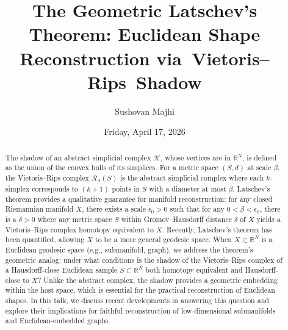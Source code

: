 \documentclass{UAmathtalk}
\author{Sushovan Majhi }
\title{The Geometric Latschev’s Theorem: Euclidean Shape Reconstruction via~Vietoris–Rips~Shadow}
\date{Friday, April 17, 2026}
\begin{document}
\maketitle
\renewcommand*{\abstractsize}{\fontsize{13.5}{16.2}\selectfont}
\begin{abstract}
{The shadow of an abstract simplicial complex $\mathcal{K}$, whose vertices are in $\mathbb{R}^N$, is defined as the union of the convex hulls of its simplices. For a metric space $(S, d)$ at scale $\beta$, the Vietoris–Rips complex $\mathcal{R}_{\beta}(S)$ is the abstract simplicial complex where each $k$-simplex corresponds to $(k + 1)$ points in $S$ with a diameter at most $\beta$. Latschev’s theorem provides a qualitative guarantee for manifold reconstruction: for any closed Riemannian manifold $X$, there exists a scale $\epsilon_0 > 0$ such that for any $0 < \beta < \epsilon_0$, there is a $\delta > 0$ where any metric space $S$ within Gromov–Hausdorff distance $\delta$ of $X$ yields a Vietoris–Rips complex homotopy equivalent to $X$. Recently, Latschev’s theorem has been quantified, allowing $X$ to be a more general geodesic space. When $X \subset \mathbb{R}^N$ is a Euclidean geodesic space (e.g., submanifold, graph), we address the theorem’s geometric analog: under what conditions is the shadow of the Vietoris–Rips complex of a Hausdorff-close Euclidean sample $S \subset \mathbb{R}^N$ both homotopy equivalent and Hausdorff-close to $X$? Unlike the abstract complex, the shadow provides a geometric embedding within the host space, which is essential for the practical reconstruction of Euclidean shapes. In this talk, we discuss recent developments in answering this question and explore their implications for faithful reconstruction of low-dimensional submanifolds and Euclidean-embedded graphs.}
\end{abstract}
\end{document}
